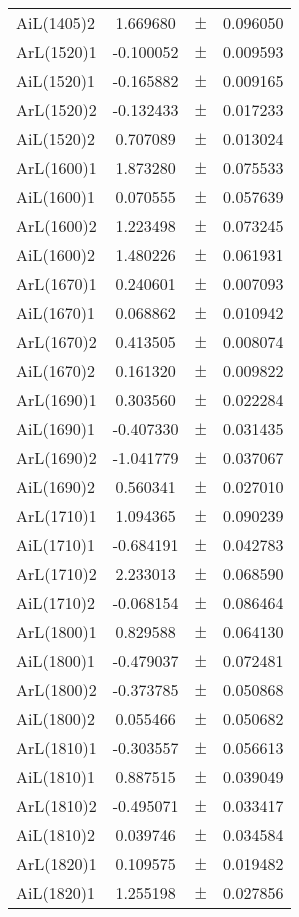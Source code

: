 \begin{table}
\begin{tiny}
\begin{tabular}{lccc}
AiL(1405)2 & 1.669680 & $\pm$ & 0.096050 \\
ArL(1520)1 & -0.100052 & $\pm$ & 0.009593 \\
AiL(1520)1 & -0.165882 & $\pm$ & 0.009165 \\
ArL(1520)2 & -0.132433 & $\pm$ & 0.017233 \\
AiL(1520)2 & 0.707089 & $\pm$ & 0.013024 \\
ArL(1600)1 & 1.873280 & $\pm$ & 0.075533 \\
AiL(1600)1 & 0.070555 & $\pm$ & 0.057639 \\
ArL(1600)2 & 1.223498 & $\pm$ & 0.073245 \\
AiL(1600)2 & 1.480226 & $\pm$ & 0.061931 \\
ArL(1670)1 & 0.240601 & $\pm$ & 0.007093 \\
AiL(1670)1 & 0.068862 & $\pm$ & 0.010942 \\
ArL(1670)2 & 0.413505 & $\pm$ & 0.008074 \\
AiL(1670)2 & 0.161320 & $\pm$ & 0.009822 \\
ArL(1690)1 & 0.303560 & $\pm$ & 0.022284 \\
AiL(1690)1 & -0.407330 & $\pm$ & 0.031435 \\
ArL(1690)2 & -1.041779 & $\pm$ & 0.037067 \\
AiL(1690)2 & 0.560341 & $\pm$ & 0.027010 \\
ArL(1710)1 & 1.094365 & $\pm$ & 0.090239 \\
AiL(1710)1 & -0.684191 & $\pm$ & 0.042783 \\
ArL(1710)2 & 2.233013 & $\pm$ & 0.068590 \\
AiL(1710)2 & -0.068154 & $\pm$ & 0.086464 \\
ArL(1800)1 & 0.829588 & $\pm$ & 0.064130 \\
AiL(1800)1 & -0.479037 & $\pm$ & 0.072481 \\
ArL(1800)2 & -0.373785 & $\pm$ & 0.050868 \\
AiL(1800)2 & 0.055466 & $\pm$ & 0.050682 \\
ArL(1810)1 & -0.303557 & $\pm$ & 0.056613 \\
AiL(1810)1 & 0.887515 & $\pm$ & 0.039049 \\
ArL(1810)2 & -0.495071 & $\pm$ & 0.033417 \\
AiL(1810)2 & 0.039746 & $\pm$ & 0.034584 \\
ArL(1820)1 & 0.109575 & $\pm$ & 0.019482 \\
AiL(1820)1 & 1.255198 & $\pm$ & 0.027856 \\

\end{tabular}
\end{tiny}
\end{table}
